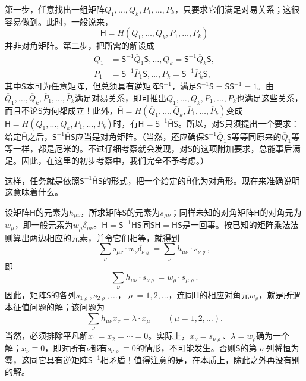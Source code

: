 \documentclass[fontsize=13pt,twoside,openany,headings=normal,parskip=false,bookmarkpackage=false,DIV=calc]{scrbook}
\begin{document}
第一步，任意找出一组矩阵$\overline Q_1,\allowbreak \ldots,\allowbreak \overline Q_k,\allowbreak \overline P_1,\allowbreak \ldots,\allowbreak \overline P_k$，只要求它们满足对易关系；这很容易做到。此时，一般说来，
\[
 \overline{\mathsf{H}}=H(\overline Q_1,\ldots,\overline Q_k,\overline P_1,\ldots,\overline P_k)
\]
并非对角矩阵。第二步，把所需的解设成
\begin{align*}
 Q_1&=\mathsf{S}^{-1}\overline Q_1\mathsf{S},\ldots,Q_k=\mathsf{S}^{-1}\overline Q_k\mathsf{S},\\
 P_1&=\mathsf{S}^{-1}\overline P_1\mathsf{S},\ldots,P_k=\mathsf{S}^{-1}\overline P_k\mathsf{S},
\end{align*}
其中$\mathsf{S}$本可为任意矩阵，但总须具有逆矩阵$\mathsf{S}^{-1}$，满足$\mathsf{S}^{-1}\mathsf{S}=\mathsf{S}\mathsf{S}^{-1}=1$。由$\overline Q_1,\allowbreak \ldots,\allowbreak \overline Q_k,\allowbreak \overline P_1,\allowbreak \ldots,\allowbreak \overline P_k$满足对易关系，即可推出$Q_1,\allowbreak \ldots,\allowbreak Q_k,\allowbreak P_1,\allowbreak \ldots,\allowbreak P_k$也满足这些关系，而且不论$\mathsf{S}$为何都成立！此外，$\overline{\mathsf{H}}=H(\overline Q_1,\allowbreak \ldots,\allowbreak \overline Q_k,\allowbreak \overline P_1,\allowbreak \ldots,\allowbreak \overline P_k)$变成$\mathsf{H}=H(Q_1,\allowbreak \ldots,\allowbreak Q_k,\allowbreak P_1,\allowbreak \ldots,\allowbreak P_k)$时，有$\mathsf{H}=\mathsf{S}^{-1}\overline{\mathsf{H}}\mathsf{S}$。所以，对$\mathsf{S}$只须提出一个要求：给定$\overline{\mathsf{H}}$之后，$\mathsf{S}^{-1}\overline{\mathsf{H}}\mathsf{S}$应当是对角矩阵。（当然，还应确保$\mathsf{S}^{-1}\overline Q_1\mathsf{S}$等等同原来的$\overline Q_1$等等一样，都是厄米的。不过仔细考察就会发现，对$\mathsf{S}$的这项附加要求，总能事后满足。因此，在这里的初步考察中，我们完全不予考虑。）

这样，任务就是依照$\mathsf{S}^{-1}\overline{\mathsf{H}}\mathsf{S}$的形式，把一个给定的$\overline{\mathsf{H}}$化为对角形。现在来准确说明这意味着什么。

\hypertarget{origpage-11}{}\label{origpage-11}设矩阵$\overline{\mathsf{H}}$的元素为$h_{\mu\nu}$，所求矩阵$\mathsf{S}$的元素为$s_{\mu\nu}$；同样未知的对角矩阵$\mathsf{H}$的对角元为$w_\mu$，即一般元素为$w_\mu\delta_{\mu\nu}$。$\mathsf{H}=\mathsf{S}^{-1}\overline{\mathsf{H}}\mathsf{S}$同$\mathsf{S}\mathsf{H}=\overline{\mathsf{H}}\mathsf{S}$是一回事。按已知的矩阵乘法法则算出两边相应的元素，并令它们相等，就得到
\[
 \sum_\nu s_{\mu\nu}\cdot w_\nu\delta_{\nu\varrho}
 =\sum_\nu h_{\mu\nu}\cdot s_{\nu\varrho},
\]
即
\[
 \sum_\nu h_{\mu\nu}\cdot s_{\nu\varrho}=w_\varrho\cdot s_{\mu\varrho}.
\]
因此，矩阵$\mathsf{S}$的各列$s_{1\varrho},\allowbreak s_{2\varrho},\allowbreak \ldots$，$\varrho=1,\allowbreak 2,\allowbreak \ldots$，连同$\mathsf{H}$的相应对角元$w_\varrho$，就是所谓本征值问题的解；该问题为
\[
 \sum_\nu h_{\mu\nu}x_\nu=\lambda\cdot x_\mu\qquad(\mu=1,2,\ldots).
\]
当然，必须排除平凡解$x_1=x_2=\cdots=0$。实际上，$x_\nu=s_{\nu\varrho}$、$\lambda=w_\varrho$确为一个解；$x_\nu\equiv0$，即对所有$\nu$都有$s_{\nu\varrho}\equiv0$的情形，不可能发生。否则$\mathsf{S}$的第$\varrho$列将恒为零，这同它具有逆矩阵$\mathsf{S}^{-1}$相矛盾！值得注意的是，在本质上，除此之外再没有别的解。
\end{document}
